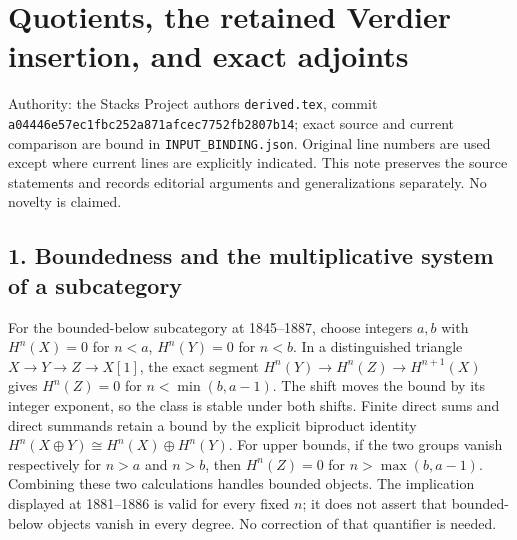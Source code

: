 \section{\texorpdfstring{Quotients,\allowbreak{} the retained Verdier insertion,\allowbreak{} and exact adjoints}{ the retained Verdier  and exact adjoints}}\label{proofs-1844-2401-quotients-the-retained-verdier-insertion-and-exact-adjoints}

Authority:\allowbreak{} the Stacks Project authors\textquotesingle{} \texttt{derived.\allowbreak{}tex},\allowbreak{} commit \texttt{a04446e5\allowbreak{}7ec1fbc2\allowbreak{}52a871af\allowbreak{}cec7752f\allowbreak{}b2807b14}; exact source and current comparison are bound in \texttt{INPUT\_\allowbreak{}BINDING.\allowbreak{}json}. Original line numbers are used except where current lines are explicitly indicated. This note preserves the source statements and records editorial arguments and generalizations separately. No novelty is claimed.

\subsection{1. Boundedness and the multiplicative system of a subcategory}\label{proofs-1844-2401-boundedness-and-the-multiplicative-system-of-a-subcategory}

For the bounded-below subcategory at 1845–\allowbreak{}1887,\allowbreak{} choose integers \(a,b\) with \(H^n(X)=0\) for \(n<a\),\allowbreak{} \(H^n(Y)=0\) for \(n<b\). In a distinguished triangle \(X\to Y\to Z\to X[1]\),\allowbreak{} the exact segment \(H^n(Y)\to H^n(Z)\to H^{n+1}(X)\) gives \(H^n(Z)=0\) for \(n<\min(b,a-1)\). The shift moves the bound by its integer exponent,\allowbreak{} so the class is stable under both shifts. Finite direct sums and direct summands retain a bound by the explicit biproduct identity \(H^n(X\oplus Y)\cong H^n(X)\oplus H^n(Y)\). For upper bounds,\allowbreak{} if the two groups vanish respectively for \(n>a\) and \(n>b\),\allowbreak{} then \(H^n(Z)=0\) for \(n>\max(b,a-1)\). Combining these two calculations handles bounded objects. The implication displayed at 1881–\allowbreak{}1886 is valid for every fixed \(n\); it does not assert that bounded-below objects vanish in every degree. No correction of that quantifier is needed.


